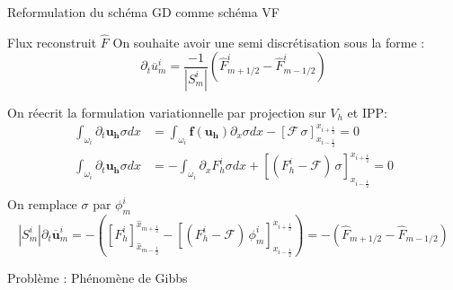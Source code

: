 


\begin{frame}{Reformulation du schéma GD comme schéma VF}

\begin{block}{Flux reconstruit $\widehat{F}$}
On souhaite avoir une semi discrétisation sous la forme :
\begin{equation}
    \partial_t \overline{u}^i_m = \frac{-1}{|S_m^i|} (\widehat{F}^i_{m+1/2}-\widehat{F}^i_{m-1/2})
\end{equation}
\end{block}
On réecrit la formulation variationnelle par projection sur $V_h$ et IPP:
\begin{align*}
\int_{\omega_i} \partial_t \mathbf{u_h} \sigma dx &= \int_{\omega_i} \mathbf{f}(\mathbf{u_h}) \partial_x \sigma  dx - \left[\mathcal{F} \,\sigma \right]_{x_{i-\frac{1}{2}}}^{x_{i+\frac{1}{2}}} = 0 \\
\int_{\omega_i} \partial_t \mathbf{u_h} \sigma dx &= -\int_{\omega_i}\partial_x F_h^i \sigma  dx + \left[(F_h^i-\mathcal{F}) \,\sigma  \right]_{x_{i-\frac{1}{2}}}^{x_{i+\frac{1}{2}}} = 0 \\
\end{align*}
On remplace $\sigma$ par $\phi_m^i$
\begin{equation}
|S_m^i|\partial_t \overline{\mathbf{u}}_m^i = -\left(\left[F_h^i \right]_{\hat{x}_{m-\frac{1}{2}}}^{\hat{x}_{m+\frac{1}{2}}} - \left[(F_h^i-\mathcal{F}) \,\phi_m^i  \right]_{x_{i-\frac{1}{2}}}^{x_{i+\frac{1}{2}}}\right) = -\left(\widehat{F}_{m+1/2}- \widehat{F}_{m-1/2}\right)                                          
\end{equation}

\end{frame}


\begin{frame}{Problème : Phénomène de Gibbs}

\\
\\

\end{frame}

